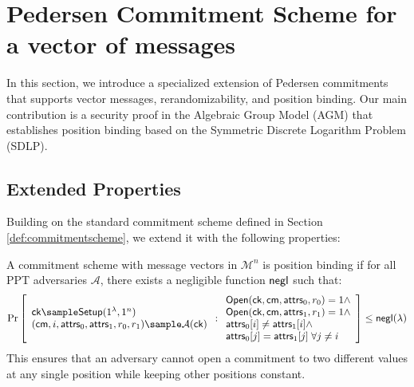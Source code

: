 % 
% 


\newpage
\section{Pedersen Commitment Scheme for a vector of messages}\label{sec:commitment}
In this section, we introduce a specialized extension of Pedersen commitments that supports vector messages, rerandomizability, and position binding. Our main contribution is a security proof in the Algebraic Group Model (AGM) that establishes position binding based on the Symmetric Discrete Logarithm Problem (SDLP).

\subsection{Extended Properties}

Building on the standard commitment scheme defined in Section \ref{def:commitmentscheme}, we extend it with the following properties:


\begin{definition}
A commitment scheme with message vectors in $\mathcal{M}^n$ is position binding if for all PPT adversaries $\mathcal{A}$, there exists a negligible function $\mathsf{negl}$ such that:
\[
    \Pr
    \left[
        \begin{array}{l}
        \mathsf{ck} \sample \mathsf{Setup}(1^\lambda, 1^n) \\
        (\mathsf{cm}, i, \attrs_0, \attrs_1, r_0, r_1) \sample \mathcal{A}(\mathsf{ck}) 
        \end{array}
        : \begin{array}{l}
            \mathsf{Open}(\mathsf{ck}, \mathsf{cm}, \attrs_0, r_0) = 1 \land \\
            \mathsf{Open}(\mathsf{ck}, \mathsf{cm}, \attrs_1, r_1) = 1 \land \\
            \attrs_0[i] \neq \attrs_1[i] \land \\
            \attrs_0[j] = \attrs_1[j] \; \forall j \neq i
          \end{array}
    \right] \leq \negl(\lambda)
\]
This ensures that an adversary cannot open a commitment to two different values at any single position while keeping other positions constant.
\end{definition}


